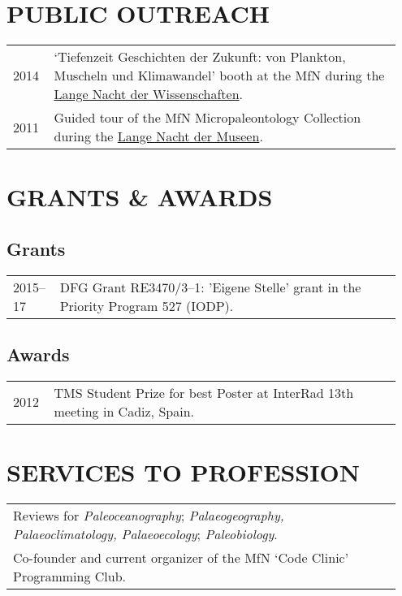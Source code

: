 \documentclass[11pt, a4paper]{article}
\begin{document}
\section{PUBLIC OUTREACH}
\begin{longtable}{p{0.1\linewidth} P{0.85\linewidth}}
2014 & `Tiefenzeit Geschichten der Zukunft: von Plankton, Muscheln und Klimawandel' booth at the MfN during the \href{http://www.langenachtderwissenschaften.de/}{Lange Nacht der Wissenschaften}.\\
2011 & Guided tour of the MfN Micropaleontology Collection during the \href{http://www.lange-nacht-der-museen.de/}{Lange Nacht der Museen}.\\
\end{longtable}

\section{GRANTS \& AWARDS}
\subsection{Grants}
\begin{longtable}{p{0.1\linewidth} P{0.85\linewidth}}
2015--17 & DFG Grant RE3470/3--1: 'Eigene Stelle' grant in the Priority Program 527 (IODP).\\
\end{longtable}
\subsection{Awards}
\begin{longtable}{p{0.1\linewidth} P{0.85\linewidth}}
2012 & TMS Student Prize for best Poster at InterRad 13th meeting in Cadiz, Spain.\\
\end{longtable}

\section{SERVICES TO PROFESSION}
\begin{longtable}{p{0.94\linewidth} p{0.01\linewidth}}
Reviews for \emph{Paleoceanography}; \emph{Palaeogeography, Palaeoclimatology, Palaeoecology}; \emph{Paleobiology}.& \\
Co-founder and current organizer of the MfN `Code Clinic' Programming Club. & \\
\end{longtable}
\end{document}
